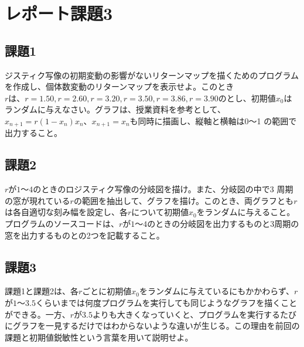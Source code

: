 \section{レポート課題3}
\subsection{課題1}
ジスティク写像の初期変動の影響がないリターンマップを描くためのプログラムを作成し、個体数変動のリターンマップを表示せよ。このとき$r は、r = 1.50, r = 2.60, r = 3.20, r = 3.50, r = 3.86, r = 3.90$のとし、初期値$x_0$はランダムに与えなさい。グラフは、授業資料を参考として、$x_{n+1} = r(1 −x_n)x_n、x_{n+1} = x_n$も同時に描画し、縦軸と横軸は0～1
の範囲で出力すること。

\subsection{課題2}
$r$が$1～4$のときのロジスティク写像の分岐図を描け。また、分岐図の中で3 周期の窓が現れている$r$の範囲を抽出して、グラフを描け。このとき、両グラフとも$r$は各自適切な刻み幅を設定し、各$r$について初期値$x_0$をランダムに与えること。プログラムのソースコードは、$r$が$1～4$のときの分岐図を出力するものと3周期の窓を出力するものとの2つを記載すること。

\subsection{課題3}
課題1と課題2は、各$r$ごとに初期値$x_0$をランダムに与えているにもかかわらず、$r$が$1～3.5$くらいまでは何度プログラムを実行しても同じようなグラフを描くことができる。一方、$r$が$3.5$よりも大きくなっていくと、プログラムを実行するたびにグラフを一見するだけではわからないような違いが生じる。この理由を前回の課題と初期値鋭敏性という言葉を用いて説明せよ。